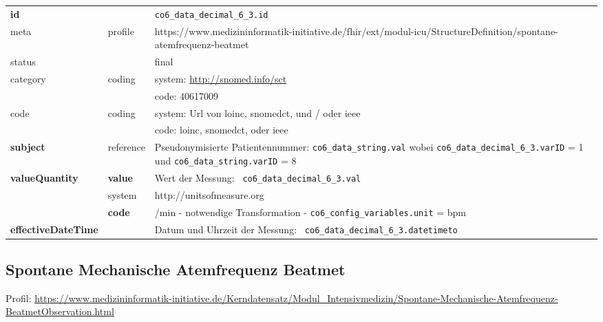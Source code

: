 \begin{longtable}{|l|l|p{7.5cm}|}
        \hline
        \rowcolor{lightgray} \multicolumn{3}{|l|}{Data Mapping (inhaltlich)} \\ \hline
        \textbf{id} &  & \texttt{co6\_data\_decimal\_6\_3.id} \\ \hline
	meta & profile & https://www.medizininformatik-initiative.de/fhir/ext/modul-icu/StructureDefinition/spontane-atemfrequenz-beatmet \\ \hline 
	status &  & final   \\ \hline 
	category & coding & system: \url{http://snomed.info/sct} \\
\cline{3-3}
	& & code: 40617009 \\ \hline
	code & coding & system: Url von \ac{loinc}, \ac{snomedct}, und / oder \ac{ieee} \\ 
	\cline{3-3} 
	 &  & code: \ac{loinc}, \ac{snomedct}, oder \ac{ieee} \\ \hline
	 \textbf{subject} & reference & Pseudonymisierte Patientennummer: \texttt{co6\_data\_string.val} wobei \texttt{co6\_data\_decimal\_6\_3.varID} = 1 und \texttt{co6\_data\_string.varID} = 8 \\ \hline
	 \textbf{valueQuantity}  & \textbf{value} & Wert der Messung: \texttt{
co6\_data\_decimal\_6\_3.val} \\
        \cline{2-3}
         & system & http://unitsofmeasure.org \\
         \cline{2-3}
         & \textbf{code} & /min - notwendige Transformation - \texttt{co6\_config\_variables.unit} = bpm \\ \hline
     \textbf{effectiveDateTime}  & & Datum und Uhrzeit der Messung: \texttt{
co6\_data\_decimal\_6\_3.datetimeto} \\ \hline
\end{longtable}


\subsection{Spontane Mechanische Atemfrequenz Beatmet} 
Profil: \url{https://www.medizininformatik-initiative.de/Kerndatensatz/Modul_Intensivmedizin/Spontane-Mechanische-Atemfrequenz-BeatmetObservation.html}

